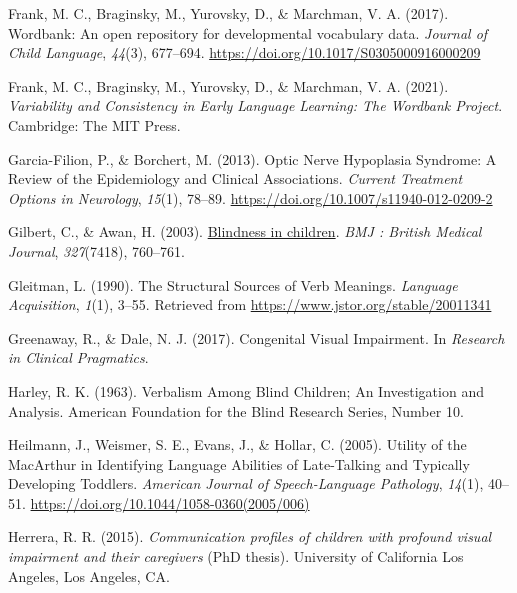 \documentclass[
  man,floatsintext]{apa6}
\newlength{\cslhangindent}
\newlength{\cslentryspacingunit} %
\newenvironment{CSLReferences}[2] %
 {%
  \setlength{\parindent}{0pt}
  \ifodd #1
  \let\oldpar\par
  \def\par{\hangindent=\cslhangindent\oldpar}
  \fi
  \setlength{\parskip}{#2\cslentryspacingunit}
 }%
 {}
\begin{document}
\begin{CSLReferences}{1}{0}
\leavevmode{}%
Frank, M. C., Braginsky, M., Yurovsky, D., \& Marchman, V. A. (2017). Wordbank: An open repository for developmental vocabulary data. \emph{Journal of Child Language}, \emph{44}(3), 677--694. \url{https://doi.org/10.1017/S0305000916000209}

\leavevmode{}%
Frank, M. C., Braginsky, M., Yurovsky, D., \& Marchman, V. A. (2021). \emph{Variability and {Consistency} in {Early Language Learning}: {The Wordbank Project}}. {Cambridge}: {The MIT Press}.

\leavevmode{}%
Garcia-Filion, P., \& Borchert, M. (2013). Optic {Nerve Hypoplasia Syndrome}: {A Review} of the {Epidemiology} and {Clinical Associations}. \emph{Current Treatment Options in Neurology}, \emph{15}(1), 78--89. \url{https://doi.org/10.1007/s11940-012-0209-2}

\leavevmode{}%
Gilbert, C., \& Awan, H. (2003). \href{https://www.ncbi.nlm.nih.gov/pmc/articles/PMC214052}{Blindness in children}. \emph{BMJ : British Medical Journal}, \emph{327}(7418), 760--761.

\leavevmode{}%
Gleitman, L. (1990). The {Structural Sources} of {Verb Meanings}. \emph{Language Acquisition}, \emph{1}(1), 3--55. Retrieved from \url{https://www.jstor.org/stable/20011341}

\leavevmode{}%
Greenaway, R., \& Dale, N. J. (2017). Congenital {Visual Impairment}. In \emph{Research in {Clinical Pragmatics}}.

\leavevmode{}%
Harley, R. K. (1963). Verbalism {Among Blind Children}; {An Investigation} and {Analysis}. {American Foundation} for the {Blind Research Series}, {Number} 10.

\leavevmode{}%
Heilmann, J., Weismer, S. E., Evans, J., \& Hollar, C. (2005). Utility of the {MacArthur} in {Identifying Language Abilities} of {Late-Talking} and {Typically Developing Toddlers}. \emph{American Journal of Speech-Language Pathology}, \emph{14}(1), 40--51. \url{https://doi.org/10.1044/1058-0360(2005/006)}

\leavevmode{}%
Herrera, R. R. (2015). \emph{Communication profiles of children with profound visual impairment and their caregivers} (PhD thesis). University of California Los Angeles, {Los Angeles, CA}.


\end{CSLReferences}
\end{document}
